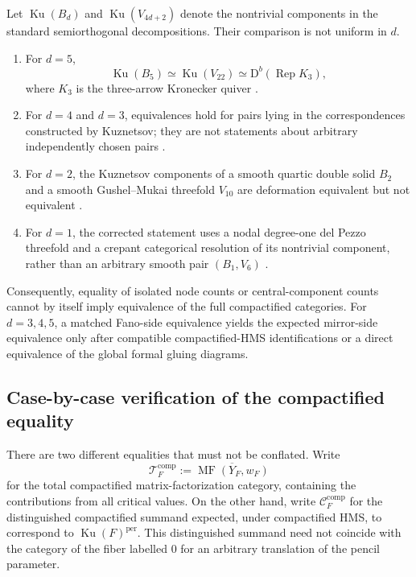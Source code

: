 \documentclass[11pt]{amsart}
\theoremstyle{definition}
\theoremstyle{remark}
\DeclareMathOperator{\MF}{MF}
\newcommand{\Db}{\mathrm D^{b}}
\begin{document}
Let $\operatorname{Ku}(B_d)$ and $\operatorname{Ku}(V_{4d+2})$ denote the
nontrivial components in the standard semiorthogonal decompositions.  Their
comparison is not uniform in $d$.
\begin{enumerate}[label=\textup{(\roman*)}]
\item For $d=5$,
\[
\operatorname{Ku}(B_5)
\simeq
\operatorname{Ku}(V_{22})
\simeq
\Db(\operatorname{Rep}K_3),
\]
where $K_3$ is the three-arrow Kronecker quiver \cite{KuzFano}.
\item For $d=4$ and $d=3$, equivalences hold for pairs lying in the
correspondences constructed by Kuznetsov; they are not statements about
arbitrary independently chosen pairs \cite{KuzFano}.
\item For $d=2$, the Kuznetsov components of a smooth quartic double solid
$B_2$ and a smooth Gushel--Mukai threefold $V_{10}$ are deformation
equivalent but not equivalent \cite{BayerPerry}.
\item For $d=1$, the corrected statement uses a nodal degree-one del Pezzo
threefold and a crepant categorical resolution of its nontrivial component,
rather than an arbitrary smooth pair $(B_1,V_6)$ \cite{KuzShinder}.
\end{enumerate}

Consequently, equality of isolated node counts or central-component counts
cannot by itself imply equivalence of the full compactified categories.  For
$d=3,4,5$, a matched Fano-side equivalence yields the expected mirror-side
equivalence only after compatible compactified-HMS identifications or a
direct equivalence of the global formal gluing diagrams.

\subsection{Case-by-case verification of the compactified equality}
\label{sec:case_by_case_compactified_equality}

There are two different equalities that must not be conflated.  Write
\[
\mathcal T_F^{\mathrm{comp}}
:=
\overline{\MF(Y_F,w_F)}
\]
for the total compactified matrix-factorization category, containing the
contributions from all critical values.  On the other hand, write
$\mathcal C_F^{\mathrm{comp}}$ for the distinguished compactified summand
expected, under compactified HMS, to correspond to
$\operatorname{Ku}(F)^{\mathrm{per}}$.  This distinguished summand need not
coincide with the category of the fiber labelled $0$ for an arbitrary
translation of the pencil parameter.
\end{document}
